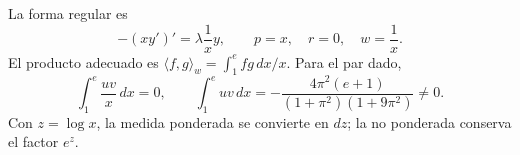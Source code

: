 La forma regular es
\[
-(xy')'=\lambda\frac1x y,
\qquad p=x,\quad r=0,\quad w=\frac1x.
\]
El producto adecuado es \(\langle f,g\rangle_w=\int_1^e fg\,dx/x\). Para el par dado,
\[
\int_1^e\frac{uv}{x}\,dx=0,\qquad
\int_1^e uv\,dx
=-\frac{4\pi^2(e+1)}{(1+\pi^2)(1+9\pi^2)}\ne0.
\]
Con \(z=\log x\), la medida ponderada se convierte en \(dz\); la no ponderada conserva el factor \(e^z\).
